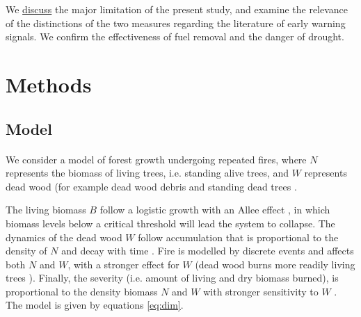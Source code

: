 \documentclass{article}
\begin{document}
We \hyperref[Discussion]{discuss} the major limitation of the present study, and examine the relevance of the distinctions of the two measures regarding the literature of early warning signals. We confirm the effectiveness of fuel removal and the danger of drought.








\newpage
\newpage
\section{Methods}


\subsection{Model}

\label{dynamical_system}

\paragraph{}
We consider a model of forest growth undergoing repeated fires, where $N$ represents the biomass of living trees, i.e. standing alive trees, and $W$ represents dead wood (for example dead wood debris and standing dead trees \citep{russell2015quantifying}. 

The living biomass $B$ follow a logistic growth \citep{tsoularis2002analysis, jensen1975comparison} with an Allee effect \citep{stephens1999allee, amarasekare1998allee}, in which biomass levels below a critical threshold will lead the system to collapse. The dynamics of the dead wood $W$ follow accumulation that is proportional to the density of $N$ and decay with time \citep{kahl_wood_2017, shorohova_stump_2012, christensen_estimation_1977, delaney_quantity_1998}. %
Fire is modelled by discrete events and affects both $N$ and $W$, with a stronger effect for $W$ (dead wood burns more readily living trees \citep{brown1985predicting}). 
Finally, the severity (i.e. amount of living and dry biomass burned), is proportional to the density biomass $N$ and $W$ with stronger sensitivity to $W$ \citep{martinson_fuel_2013, safford_effects_2009, lecomte_effects_2006}. The model is given by equations \ref{eq:dim}.
\end{document}
